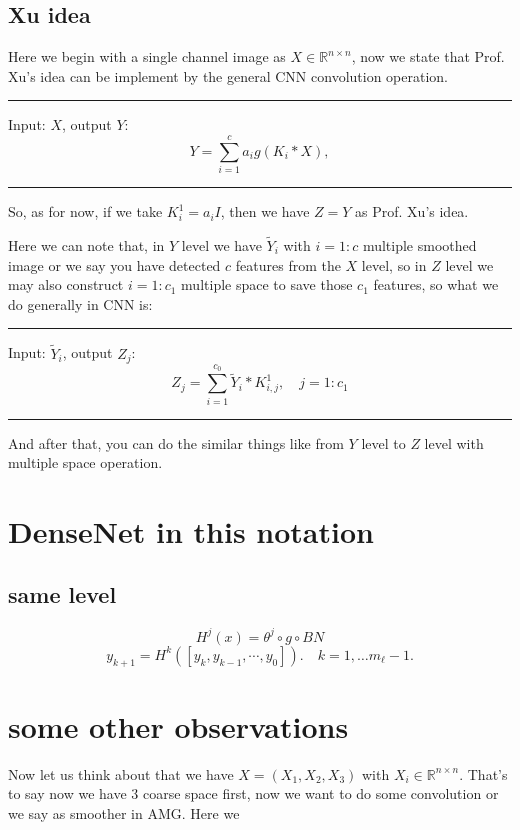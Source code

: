 \newpage
\subsection{Xu idea}
Here we begin with a single channel image as $X \in \mathbb{R}^{n\times n}$, now we state that Prof. Xu's idea can be implement by the general CNN convolution operation.  
\bigskip
\hrule
Input: $X$, output $Y$:
\begin{equation}
Y = \sum_{i=1}^c a_i g(K_i \ast X),
\end{equation}
\hrule
\bigskip

So, as for now, if we take $K^1_i = a_i I$, then we have $Z = Y$ as Prof. Xu's idea. 

Here we can note that, in $Y$ level we have $\tilde Y_i$ with $i=1:c$ multiple smoothed image or we say you have detected $c$ features from the $X$ level, so in $Z$ level we may also construct $i = 1:c_1$  multiple space to save those $c_1$ features, so what we do generally in CNN is:
\bigskip
\hrule
Input: $\tilde Y_i$, output $Z_j$:
\begin{equation}
Z_j = \sum_{i=1}^{c_0} \tilde Y_i \ast K^1_{i,j}, \quad j = 1:c_1
\end{equation}
\hrule
\bigskip

And after that, you can do the similar things like from $Y$ level to $Z$ level with multiple space operation. 

\section{DenseNet in this notation}
\subsection{same level}

$$
H^{j}(x) = \theta^j \circ g \circ BN
$$
$$
y_{k+1}= H^{k}([y_k, y_{k-1},\cdots, y_0]).
\quad k=1,\ldots m_\ell-1.
$$


\newpage
\section{some other observations}
Now let us think about that we have $X = (X_1, X_2, X_3)$ with $X_i \in \mathbb{R}^{n\times n}$. That's to say now we have $3$ coarse space first, now we want to do some convolution or we say as smoother in AMG. Here we 

